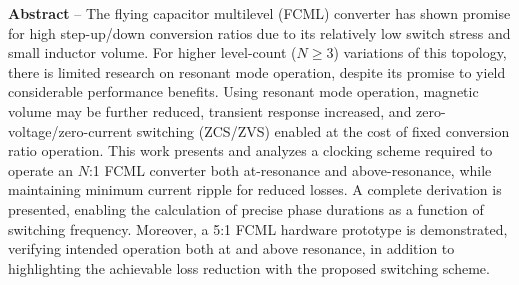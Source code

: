 \vspace{-10pt}
\noindent \textbf{{\small Abstract}} -- {\small The flying capacitor multilevel (FCML) converter has shown promise for high step-up/down conversion ratios due to its relatively low switch stress and small inductor volume.
For higher level-count ($N\geq3$) variations of this topology, there is limited research on resonant mode operation, despite its promise to yield considerable performance benefits. Using resonant mode operation, magnetic volume may be further reduced, transient response increased, and zero-voltage/zero-current switching (ZCS/ZVS) enabled at the cost of fixed conversion ratio operation.
This work presents and analyzes a clocking scheme required to operate an $N$:1 FCML converter both at-resonance and above-resonance, while maintaining minimum current ripple for reduced losses. A complete derivation is presented, enabling the calculation of precise phase durations as a function of switching frequency. 
Moreover, a 5:1 FCML hardware prototype is demonstrated, verifying intended operation both at and above resonance, in addition to highlighting the achievable loss reduction with the proposed switching scheme. }




